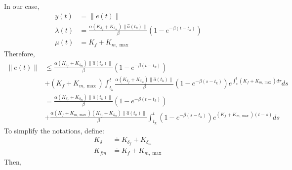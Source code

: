 \documentclass{article}
\begin{document}
In our case,
\begin{equation}
	\begin{aligned}
		y(t) &= \|e(t)\|\\
		\lambda(t) &= \frac{\alpha(K_{\delta_f} + K_{\delta_m})\|\hat{a}(t_k)\|}{\beta}(1 - e^{-\beta(t - t_k)})\\
		\mu(t) &= K_f + K_{m, \max}
	\end{aligned}
\end{equation}
Therefore,
\begin{equation}
	\begin{aligned}
		\|e(t)\| &\leq \frac{\alpha(K_{\delta_f} + K_{\delta_m})\|\hat{a}(t_k)\|}{\beta}(1 - e^{-\beta(t - t_k)}) \\&+ (K_f + K_{m, \max})\int_{t_k}^t \frac{\alpha(K_{\delta_f} + K_{\delta_m})\|\hat{a}(t_k)\|}{\beta}(1 - e^{-\beta(s - t_k)})e^{\int_s^t(K_f + K_{m, \max})d\tau}ds\\
				 &= \frac{\alpha(K_{\delta_f} + K_{\delta_m})\|\hat{a}(t_k)\|}{\beta}(1 - e^{-\beta(t - t_k)}) \\&+ \frac{\alpha(K_f + K_{m, \max})(K_{\delta_f} + K_{\delta_m})\|\hat{a}(t_k)\|}{\beta}\int_{t_k}^t(1 - e^{-\beta(s - t_k)})e^{(K_f + K_{m, \max})(t-s)}ds
	\end{aligned}
\end{equation}
To simplify the notations, define:
\begin{equation}
	\begin{aligned}
		K_\delta &\doteq K_{\delta_f} + K_{\delta_m}\\
		K_{fm} &\doteq K_f + K_{m, \max}
	\end{aligned}
\end{equation}
Then,
\end{document}
